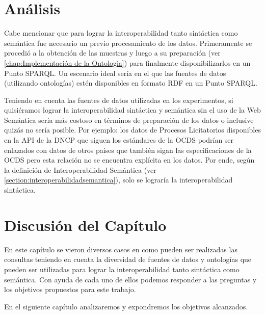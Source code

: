 \section{Análisis}
Cabe mencionar que para lograr la interoperabilidad tanto sintáctica como semántica fue necesario un previo procesamiento de los datos. Primeramente se procedió a la obtención de las muestras y luego a su preparación (ver \ref{chap:Implementación de la Ontologia}) para finalmente disponibilizarlos en un Punto SPARQL. Un escenario ideal sería en el que las fuentes de datos (utilizando ontologías) estén disponibles en formato RDF en un Punto SPARQL.

Teniendo en cuenta las fuentes de datos utilizadas en los experimentos, si quisiéramos lograr la interoperabilidad sintáctica y semántica sin el uso de la Web Semántica sería más costoso en términos de preparación de los datos o inclusive quizás no sería posible. Por ejemplo: los datos de Procesos Licitatorios disponibles en la API de la DNCP que siguen los estándares de la OCDS podrían ser enlazados con datos de otros países que también sigan las especificaciones de la OCDS pero esta relación no se encuentra explícita en los datos. Por ende, según la definición de Interoperabilidad Semántica (ver \ref{section:interoperabilidadsemantica}), solo se lograría la interoperabilidad sintáctica.

\section{Discusión del Capítulo}

En este capítulo se vieron diversos casos en como pueden ser realizadas las consultas teniendo en cuenta la diversidad de fuentes de datos y ontologías que pueden ser utilizadas para lograr la interoperabilidad tanto sintáctica como semántica. Con ayuda de cada uno de ellos podemos responder a las preguntas y los objetivos propuestos para este trabajo.
 
En el siguiente capítulo analizaremos y expondremos los objetivos alcanzados.



